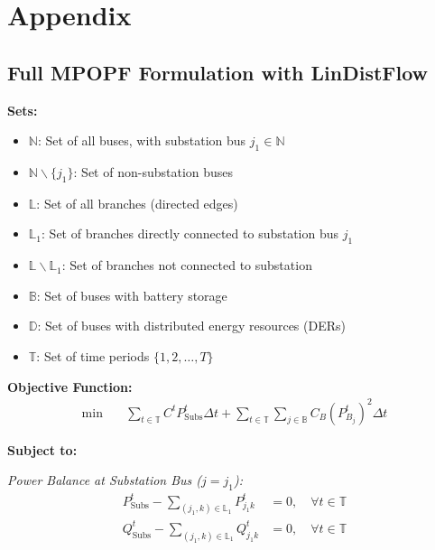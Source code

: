 \newpage

\appendix
\section*{Appendix}
\label{sec:appendix}

% 

\subsection*{Full MPOPF Formulation with LinDistFlow}
\label{subsec:full-mpopf}

\textbf{Sets:}
\begin{itemize}
    \item $\mathbb{N}$: Set of all buses, with substation bus $j_1 \in \mathbb{N}$
    \item $\mathbb{N} \backslash \{j_1\}$: Set of non-substation buses
    \item $\mathbb{L}$: Set of all branches (directed edges)
    \item $\mathbb{L}_1$: Set of branches directly connected to substation bus $j_1$
    \item $\mathbb{L} \backslash \mathbb{L}_1$: Set of branches not connected to substation
    \item $\mathbb{B}$: Set of buses with battery storage
    \item $\mathbb{D}$: Set of buses with distributed energy resources (DERs)
    \item $\mathbb{T}$: Set of time periods $\{1, 2, \ldots, T\}$
\end{itemize}

\textbf{Objective Function:}
\begin{align}
    \min \quad & \sum_{t \in \mathbb{T}} C^t P^t_{\text{Subs}} \Delta t 
    + \sum_{t \in \mathbb{T}} \sum_{j \in \mathbb{B}} C_B (P_{B_j}^t)^2 \Delta t
\end{align}

\textbf{Subject to:}

\textit{Power Balance at Substation Bus ($j = j_1$):}
\begin{align}
    P^t_{\text{Subs}} - \sum_{(j_1, k) \in \mathbb{L}_1} P_{j_1 k}^t &= 0, \quad \forall t \in \mathbb{T} \label{eq:subs_real} \\
    Q^t_{\text{Subs}} - \sum_{(j_1, k) \in \mathbb{L}_1} Q_{j_1 k}^t &= 0, \quad \forall t \in \mathbb{T} \label{eq:subs_reactive}
\end{align}

